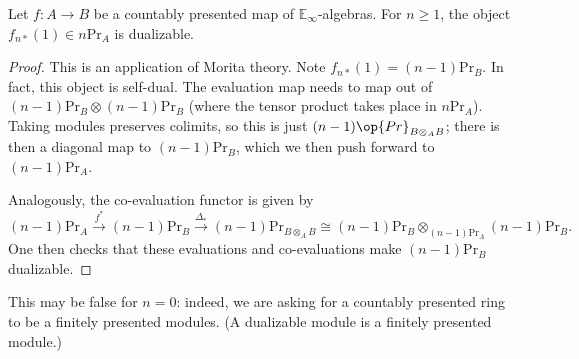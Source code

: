 \documentclass[../notes.tex]{subfiles}
\begin{document}
\begin{lemma} \label{lem:dual-of-pr}
	Let $f\colon A\to B$ be a countably presented map of $\mathbb E_\infty$-algebras. For $n\ge1$, the object $f_{n*}(1)\in n\mathrm{Pr}_A$ is dualizable.
\end{lemma}
\begin{proof}
	This is an application of Morita theory. Note $f_{n*}(1)=(n-1)\mathrm{Pr}_B$. In fact, this object is self-dual. The evaluation map needs to map out of $(n-1)\mathrm{Pr}_B\otimes(n-1)\mathrm{Pr}_B$ (where the tensor product takes place in $n\mathrm{Pr}_A$). Taking modules preserves colimits, so this is just $(n-1)\op{Pr}_{B\otimes_AB}$; there is then a diagonal map to $(n-1)\mathrm{Pr}_B$, which we then push forward to $(n-1)\mathrm{Pr}_A$.

	Analogously, the co-evaluation functor is given by
	\[(n-1)\mathrm{Pr}_A\stackrel{f^*}\to(n-1)\mathrm{Pr}_B\stackrel{\Delta_*}\to(n-1)\mathrm{Pr}_{B\otimes_AB}\cong(n-1)\mathrm{Pr}_B\otimes_{(n-1)\mathrm{Pr}_A}(n-1)\mathrm{Pr}_B.\]
	One then checks that these evaluations and co-evaluations make $(n-1)\mathrm{Pr}_B$ dualizable.
\end{proof}
\begin{remark}
	This may be false for $n=0$: indeed, we are asking for a countably presented ring to be a finitely presented modules. (A dualizable module is a finitely presented module.)
\end{remark}
\end{document}
